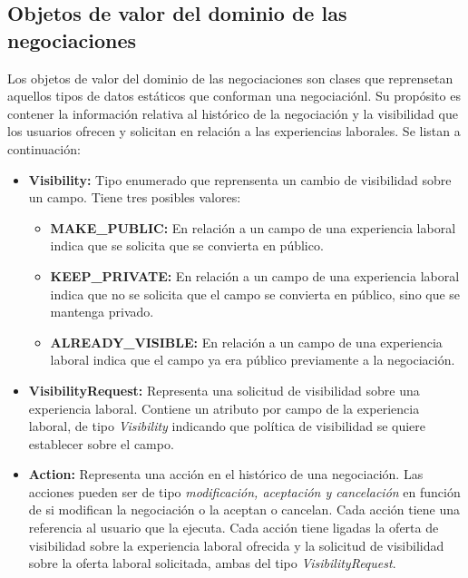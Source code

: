\documentclass[a4paper, 12pt]{book}
\begin{document}
    \subsection{Objetos de valor del dominio de las negociaciones}
    \label{subsec:negotiation_value_objects}
    Los objetos de valor del dominio de las negociaciones son clases que reprensetan aquellos tipos de datos estáticos que conforman una negociaciónl.
    Su propósito es contener la información relativa al histórico de la negociación y la visibilidad que los usuarios ofrecen y solicitan en relación a las experiencias laborales.
    Se listan a continuación:

    \begin{itemize}
        \item \textbf{Visibility:} Tipo enumerado que reprensenta un cambio de visibilidad sobre un campo. Tiene tres posibles valores:
        \begin{itemize}
            \item \textbf{MAKE\_PUBLIC:} En relación a un campo de una experiencia laboral indica que se solicita que se convierta en público.
            \item \textbf{KEEP\_PRIVATE:} En relación a un campo de una experiencia laboral indica que no se solicita que el campo se convierta en público, sino que se mantenga privado.
            \item \textbf{ALREADY\_VISIBLE:} En relación a un campo de una experiencia laboral indica que el campo ya era público previamente a la negociación.
        \end{itemize}
        \item \textbf{VisibilityRequest:} Representa una solicitud de visibilidad sobre una experiencia laboral. Contiene un atributo por campo de la experiencia laboral, de tipo \emph{Visibility} indicando que política de visibilidad se quiere establecer sobre el campo.
        \item \textbf{Action:} Representa una acción en el histórico de una negociación. Las acciones pueden ser de tipo \emph{modificación, aceptación y cancelación} en función de si modifican la negociación o la aceptan o cancelan.
        Cada acción tiene una referencia al usuario que la ejecuta.
        Cada acción tiene ligadas la oferta de visibilidad sobre la experiencia laboral ofrecida y la solicitud de visibilidad sobre la oferta laboral solicitada, ambas del tipo \emph{VisibilityRequest}.
    \end{itemize}
\end{document}
